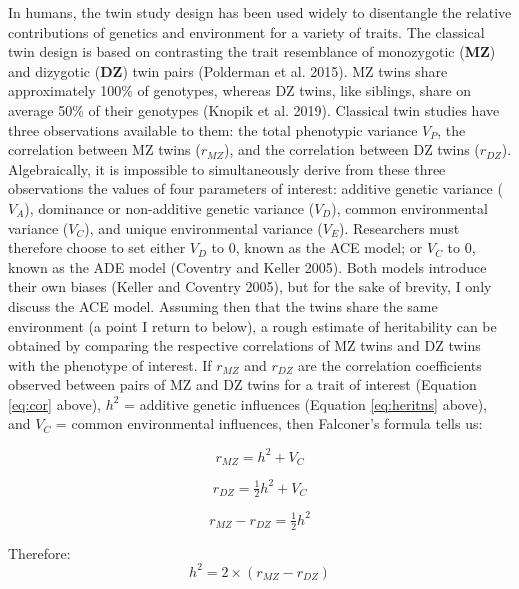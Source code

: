 \documentclass[
]{book}
\begin{document}
In humans, the twin study design has been used widely to disentangle the relative contributions of genetics and environment for a variety of traits. The classical twin design is based on contrasting the trait resemblance of monozygotic (\textbf{MZ}) and dizygotic (\textbf{DZ}) twin pairs (Polderman et al. 2015). MZ twins share approximately 100\% of genotypes, whereas DZ twins, like siblings, share on average 50\% of their genotypes (Knopik et al. 2019). Classical twin studies have three observations available to them: the total phenotypic variance \(V_P\), the correlation between MZ twins (\(r_{MZ}\)), and the correlation between DZ twins (\(r_{DZ}\)). Algebraically, it is impossible to simultaneously derive from these three observations the values of four parameters of interest: additive genetic variance (\(V_A\)), dominance or non-additive genetic variance (\(V_D\)), common environmental variance (\(V_C\)), and unique environmental variance (\(V_E\)). Researchers must therefore choose to set either \(V_D\) to 0, known as the ACE model; or \(V_C\) to 0, known as the ADE model (Coventry and Keller 2005). Both models introduce their own biases (Keller and Coventry 2005), but for the sake of brevity, I only discuss the ACE model. Assuming then that the twins share the same environment (a point I return to below), a rough estimate of heritability can be obtained by comparing the respective correlations of MZ twins and DZ twins with the phenotype of interest. If \(r_{MZ}\) and \(r_{DZ}\) are the correlation coefficients observed between pairs of MZ and DZ twins for a trait of interest (Equation \eqref{eq:cor} above), \(h^2\) = additive genetic influences (Equation \eqref{eq:heritns} above), and \(V_C\) = common environmental influences, then Falconer's formula tells us:

\begin{equation}
r_{MZ} = h^2 + V_C
\end{equation}

\begin{equation}
r_{DZ} = \tfrac{1}{2}h^2 + V_C
\end{equation}

\begin{equation}
r_{MZ} - r_{DZ}  = \tfrac{1}{2}h^2
\end{equation}

Therefore:
\begin{equation}
h^2 = 2\times(r_{MZ} - r_{DZ})
\end{equation}
\end{document}
